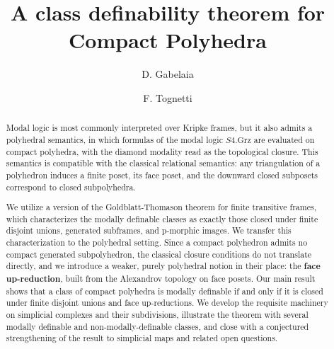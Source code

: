 \documentclass{amsart}
\title{A class definability theorem for Compact Polyhedra}
\author{D. Gabelaia \and F. Tognetti}
\numberwithin{equation}{subsection}
\begin{document}
\begin{abstract}
    Modal logic is most commonly interpreted over Kripke frames,
    but it also admits a polyhedral semantics, in which formulas of the modal logic 
    $S4.\text{Grz}$ are evaluated on compact polyhedra, 
    with the diamond modality read as the topological closure. 
    This semantics is compatible with the classical relational semantics: 
    any triangulation of a polyhedron induces a finite poset, 
    its face poset, and the downward closed subposets correspond to closed subpolyhedra.

    We utilize a version of the Goldblatt-Thomason theorem for finite transitive frames,
    which characterizes the modally definable classes as exactly those 
    closed under finite disjoint unions, generated subframes, and p-morphic images. 
    We transfer this characterization to the polyhedral setting. 
    Since a compact polyhedron admits no compact generated subpolyhedron, 
    the classical closure conditions do not translate directly, 
    and we introduce a weaker, purely polyhedral notion in their place:
     the \textbf{face up-reduction}, built from the Alexandrov topology on face posets. 
     Our main result shows that a class of compact polyhedra is modally definable 
     if and only if it is closed under finite disjoint unions and face up-reductions. 
     We develop the requisite machinery on simplicial complexes and their subdivisions, 
     illustrate the theorem with several modally definable and non-modally-definable classes, 
     and close with a conjectured strengthening 
     of the result to simplicial maps and related open questions.
\end{abstract}
\maketitle
\tableofcontents






\nocite{*}
\printbibliography
\end{document}
